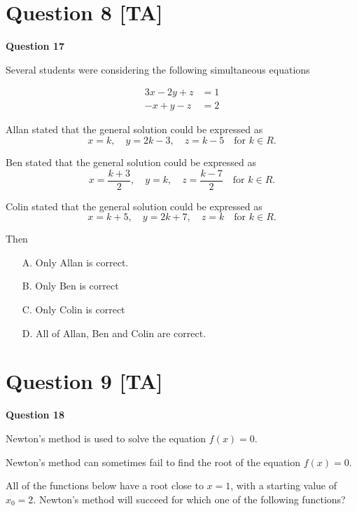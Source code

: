 \documentclass[12pt,a4paper]{article}
\begin{document}
\vspace{5\baselineskip}

\hrulefill

\section*{Question 8 [TA]}

\textbf{Question 17}

Several students were considering the following simultaneous equations

\begin{align*}
3x - 2y + z &= 1\\
-x + y - z &= 2
\end{align*}

Allan stated that the general solution could be expressed as
\[
x = k, \quad y = 2k - 3, \quad z = k - 5 \quad \text{for } k \in R.
\]

Ben stated that the general solution could be expressed as
\[
x = \frac{k+3}{2}, \quad y = k, \quad z = \frac{k-7}{2} \quad \text{for } k \in R.
\]

Colin stated that the general solution could be expressed as
\[
x = k + 5, \quad y = 2k + 7, \quad z = k \quad \text{for } k \in R.
\]

Then

\begin{enumerate}
    \item[A.] Only Allan is correct.
    \item[B.] Only Ben is correct
    \item[C.] Only Colin is correct
    \item[D.] All of Allan, Ben and Colin are correct.
\end{enumerate}

\vspace{5\baselineskip}

\hrulefill

\section*{Question 9 [TA]}

\textbf{Question 18}

Newton's method is used to solve the equation $f(x) = 0$.

Newton's method can sometimes fail to find the root of the equation $f(x) = 0$.

All of the functions below have a root close to $x = 1$, with a starting value of $x_0 = 2$. Newton's method will succeed for which one of the following functions?
\end{document}
